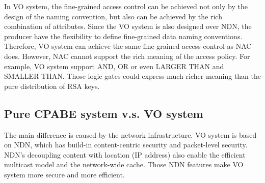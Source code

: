 \begin{itemize}
In VO system, the fine-grained access control can be achieved not only by the design of the naming convention, but also can be achieved by the rich combination of attributes.
Since the VO system is also designed over NDN, the producer have the flexibility to define fine-grained data naming conventions.
Therefore, VO system can achieve the same fine-grained access control as NAC does.
However, NAC cannot support the rich meaning of the access policy.
For example, VO system support AND, OR or even LARGER THAN and SMALLER THAN.
Those logic gates could express much richer meaning than the pure distribution of RSA keys.

\end{itemize}

\subsection{Pure CPABE system v.s. VO system}

The main difference is caused by the network infrastructure.
VO system is based on NDN, which has build-in content-centric security and packet-level security.
NDN's decoupling content with location (IP address) also enable the efficient multicast model and the network-wide cache.
Those NDN features make VO system more secure and more efficient.
